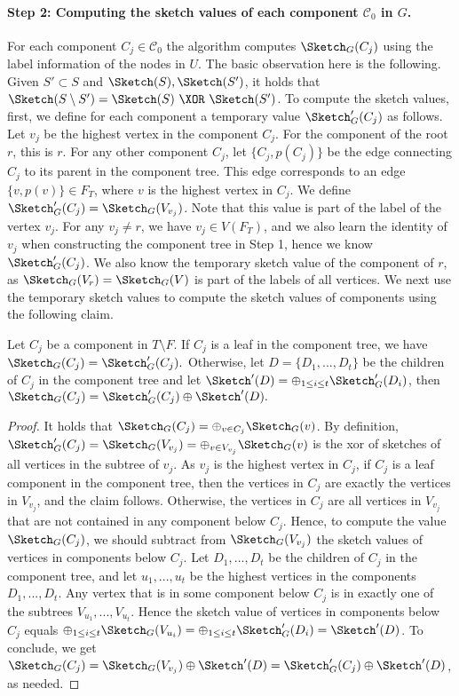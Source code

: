 \paragraph{Step 2: Computing the sketch values of each component $\mathcal{C}_0$ in $G$.} 
For each component $C_j \in \mathcal{C}_0$ the algorithm computes $\Sketch_G(C_j)$ using the label information of the nodes in $U$.  The basic observation here is the following. Given $S' \subset S$ and $\Sketch(S), \Sketch(S')$, it holds that $\Sketch(S \setminus S')=\Sketch(S) ~\XOR~ \Sketch(S')$. To compute the sketch values, first, we define for each component a temporary value $\Sketch'_G(C_j)$ as follows. Let $v_j$ be the highest vertex in the component $C_j$. For the component of the root $r$, this is $r$. For any other component $C_j$, let $\{C_j,p(C_j)\}$ be the edge connecting $C_j$ to its parent in the component tree. This edge corresponds to an edge $\{v,p(v)\} \in F_T$, where $v$ is the highest vertex in $C_j$. We define $\Sketch'_G(C_j) = \Sketch_G(V_{v_j})$. Note that this value is part of the label of the vertex $v_j$. For any $v_j \neq r$, we have $v_j \in V(F_T)$, and we also learn the identity of $v_j$ when constructing the component tree in Step 1, hence we know $\Sketch'_G(C_j)$. We also know the temporary sketch value of the component of $r$, as $\Sketch_G(V_{r})=\Sketch_G(V)$ is part of the labels of all vertices. We next use the temporary sketch values to compute the sketch values of components using the following claim.

\begin{claim}
Let $C_j$ be a component in $T \setminus F$. If $C_j$ is a leaf in the component tree, we have $\Sketch_G(C_j) = \Sketch'_G(C_j).$ Otherwise, let $D=\{D_1,...,D_t\}$ be the children of $C_j$ in the component tree and let $\Sketch'(D)=\oplus_{1 \leq i \leq t} \Sketch'_G(D_i)$, then $\Sketch_G(C_j) = \Sketch'_G(C_j) \oplus \Sketch'(D).$ 
\end{claim}

\begin{proof}
It holds that $\Sketch_G(C_j) = \oplus_{v \in C_j} \Sketch_G(v)$. By definition, $\Sketch'_G(C_j)=\Sketch_G(V_{v_j}) = \oplus_{v \in V_{v_j}} \Sketch_G(v)$ is the xor of sketches of all vertices in the subtree of $v_j$. As $v_j$ is the highest vertex in $C_j$, if $C_j$ is a leaf component in the component tree, then the vertices in $C_j$ are exactly the vertices in $V_{v_j}$, and the claim follows. Otherwise, the vertices in $C_j$ are all vertices in $V_{v_j}$ that are not contained in any component below $C_j$. Hence, to compute the value $\Sketch_G(C_j)$, we should subtract from $\Sketch_G(V_{v_j})$ the sketch values of vertices in components below $C_j$. Let $D_1,...,D_t$ be the children of $C_j$ in the component tree, and let $u_1,...,u_t$ be the highest vertices in the components $D_1,...,D_t$. Any vertex that is in some component below $C_j$ is in exactly one of the subtrees $V_{u_1},...,V_{u_t}$. Hence the sketch value of vertices in components below $C_j$ equals $\oplus_{1 \leq i \leq t} \Sketch_G(V_{u_i})= \oplus_{1 \leq i \leq t} \Sketch'_G(D_i)=\Sketch'(D)$. To conclude, we get $\Sketch_G(C_j)=\Sketch_G(V_{v_j}) \oplus \Sketch'(D)=\Sketch'_G(C_j) \oplus \Sketch'(D)$, as needed.
\end{proof}

